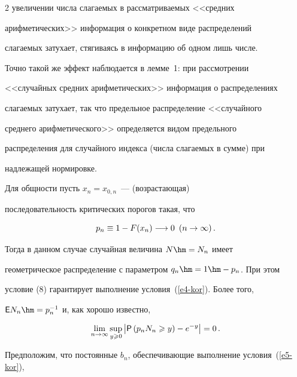 \begin{multicols}{2}
увеличении числа слагаемых в рассматриваемых <<средних


арифметических>> информация о конкретном виде распределений


слагаемых затухает, стягиваясь в информацию об одном лишь числе.


Точно такой же эффект наблюдается в лемме~1: при рас\-смот\-ре\-нии


<<случайных средних арифметических>> информация о распределениях


слагаемых затухает, так что предельное распределение <<случайного


среднего арифметического>> определяется видом предельного


распределения для случайного индекса (числа слагаемых в сумме) при


надлежащей нормировке.





\smallskip





Для общности пусть $x_n=x_{0,n}$~--- (возрас\-та\-ющая)


последовательность критических порогов такая, что


\begin{equation}


p_n\equiv 1-F(x_n)\longrightarrow 0 \enskip (n\to\infty)\,.\label{e8-kor}


\end{equation}


Тогда в данном случае случайная величина $N\hm=N_n$ имеет


геометрическое распределение с параметром $q_n\hm=1\hm-p_n$. При этом


условие (8) гарантирует выполнение условия~(\ref{e4-kor}). Более того, 


${\sf E}N_n\hm=p_n^{-1}$ и, как хорошо известно,


\begin{equation*}


\lim\limits_{n\to\infty}\sup\limits_{y\geqslant0}\left\vert{\sf P}\left(p_nN_n\geqslant


y\right)-e^{-y}\right\vert =0\,. %


\end{equation*}





Предположим, что постоянные $b_n$, обеспечивающие выполнение условия~(\ref{e5-kor}), 



\end{multicols}
